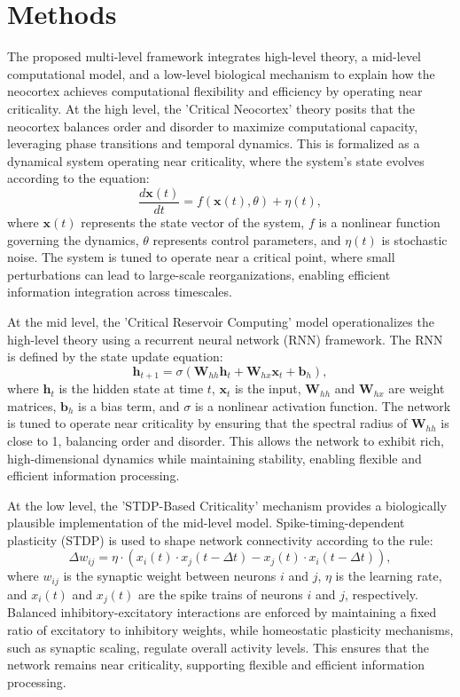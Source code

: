 \documentclass{article}
\begin{document}
\section{Methods}
The proposed multi-level framework integrates high-level theory, a mid-level computational model, and a low-level biological mechanism to explain how the neocortex achieves computational flexibility and efficiency by operating near criticality. At the high level, the 'Critical Neocortex' theory posits that the neocortex balances order and disorder to maximize computational capacity, leveraging phase transitions and temporal dynamics. This is formalized as a dynamical system operating near criticality, where the system's state evolves according to the equation:
\begin{equation}
\frac{d\mathbf{x}(t)}{dt} = f(\mathbf{x}(t), \theta) + \eta(t),
\end{equation}
where $\mathbf{x}(t)$ represents the state vector of the system, $f$ is a nonlinear function governing the dynamics, $\theta$ represents control parameters, and $\eta(t)$ is stochastic noise. The system is tuned to operate near a critical point, where small perturbations can lead to large-scale reorganizations, enabling efficient information integration across timescales.

At the mid level, the 'Critical Reservoir Computing' model operationalizes the high-level theory using a recurrent neural network (RNN) framework. The RNN is defined by the state update equation:
\begin{equation}
\mathbf{h}_{t+1} = \sigma(\mathbf{W}_{hh} \mathbf{h}_t + \mathbf{W}_{hx} \mathbf{x}_t + \mathbf{b}_h),
\end{equation}
where $\mathbf{h}_t$ is the hidden state at time $t$, $\mathbf{x}_t$ is the input, $\mathbf{W}_{hh}$ and $\mathbf{W}_{hx}$ are weight matrices, $\mathbf{b}_h$ is a bias term, and $\sigma$ is a nonlinear activation function. The network is tuned to operate near criticality by ensuring that the spectral radius of $\mathbf{W}_{hh}$ is close to 1, balancing order and disorder. This allows the network to exhibit rich, high-dimensional dynamics while maintaining stability, enabling flexible and efficient information processing.

At the low level, the 'STDP-Based Criticality' mechanism provides a biologically plausible implementation of the mid-level model. Spike-timing-dependent plasticity (STDP) is used to shape network connectivity according to the rule:
\begin{equation}
\Delta w_{ij} = \eta \cdot (x_i(t) \cdot x_j(t - \Delta t) - x_j(t) \cdot x_i(t - \Delta t)),
\end{equation}
where $w_{ij}$ is the synaptic weight between neurons $i$ and $j$, $\eta$ is the learning rate, and $x_i(t)$ and $x_j(t)$ are the spike trains of neurons $i$ and $j$, respectively. Balanced inhibitory-excitatory interactions are enforced by maintaining a fixed ratio of excitatory to inhibitory weights, while homeostatic plasticity mechanisms, such as synaptic scaling, regulate overall activity levels. This ensures that the network remains near criticality, supporting flexible and efficient information processing.
\end{document}
